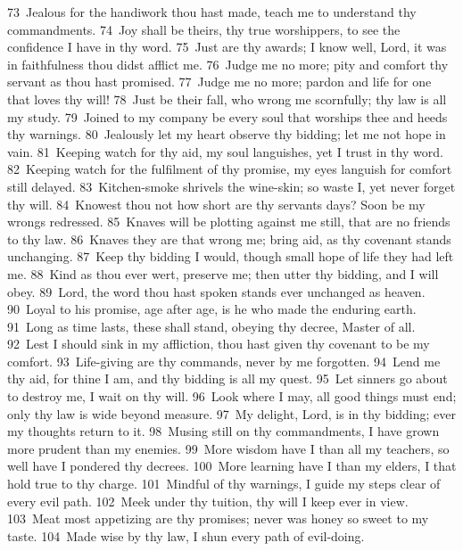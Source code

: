 \documentclass[10pt]{book} %
\begin{document}
\textcolor{benred8}{73}~Jealous for the handiwork thou hast made, teach me to understand thy commandments. \textcolor{benred8}{74}~Joy shall be theirs, thy true worshippers, to see the confidence I have in thy word. \textcolor{benred8}{75}~Just are thy awards; I know well, Lord, it was in faithfulness thou didst afflict me. \textcolor{benred8}{76}~Judge me no more; pity and comfort thy servant as thou hast promised. \textcolor{benred8}{77}~Judge me no more; pardon and life for one that loves thy will! \textcolor{benred8}{78}~Just be their fall, who wrong me scornfully; thy law is all my study. \textcolor{benred8}{79}~Joined to my company be every soul that worships thee and heeds thy warnings. \textcolor{benred8}{80}~Jealously let my heart observe thy bidding; let me not hope in vain.
\textcolor{benred8}{81}~Keeping watch for thy aid, my soul languishes, yet I trust in thy word. \textcolor{benred8}{82}~Keeping watch for the fulfilment of thy promise, my eyes languish for comfort still delayed. \textcolor{benred8}{83}~Kitchen-smoke shrivels the wine-skin; so waste I, yet never forget thy will. \textcolor{benred8}{84}~Knowest thou not how short are thy servant\textquotesingle s days? Soon be my wrongs redressed. \textcolor{benred8}{85}~Knaves will be plotting against me still, that are no friends to thy law. \textcolor{benred8}{86}~Knaves they are that wrong me; bring aid, as thy covenant stands unchanging. \textcolor{benred8}{87}~Keep thy bidding I would, though small hope of life they had left me. \textcolor{benred8}{88}~Kind as thou ever wert, preserve me; then utter thy bidding, and I will obey.
\textcolor{benred8}{89}~Lord, the word thou hast spoken stands ever unchanged as heaven. \textcolor{benred8}{90}~Loyal to his promise, age after age, is he who made the enduring earth. \textcolor{benred8}{91}~Long as time lasts, these shall stand, obeying thy decree, Master of all. \textcolor{benred8}{92}~Lest I should sink in my affliction, thou hast given thy covenant to be my comfort. \textcolor{benred8}{93}~Life-giving are thy commands, never by me forgotten. \textcolor{benred8}{94}~Lend me thy aid, for thine I am, and thy bidding is all my quest. \textcolor{benred8}{95}~Let sinners go about to destroy me, I wait on thy will. \textcolor{benred8}{96}~Look where I may, all good things must end; only thy law is wide beyond measure.
\textcolor{benred8}{97}~My delight, Lord, is in thy bidding; ever my thoughts return to it. \textcolor{benred8}{98}~Musing still on thy commandments, I have grown more prudent than my enemies. \textcolor{benred8}{99}~More wisdom have I than all my teachers, so well have I pondered thy decrees. \textcolor{benred8}{100}~More learning have I than my elders, I that hold true to thy charge. \textcolor{benred8}{101}~Mindful of thy warnings, I guide my steps clear of every evil path. \textcolor{benred8}{102}~Meek under thy tuition, thy will I keep ever in view. \textcolor{benred8}{103}~Meat most appetizing are thy promises; never was honey so sweet to my taste. \textcolor{benred8}{104}~Made wise by thy law, I shun every path of evil-doing.
\end{document}
